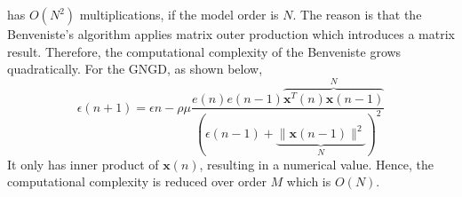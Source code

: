 has $O(N^2)$ multiplications, if the model order is $N$. The reason is that the Benveniste's algorithm applies matrix outer production which introduces a matrix result. Therefore, the computational complexity of the Benveniste grows quadratically. For the GNGD, as shown below,
\begin{equation}
	\epsilon(n+1)=\epsilon{n}-\rho\mu\frac{e(n)e(n-1)\overbrace{\mathbf x^T(n)\mathbf x(n-1)}^{N}}{(\epsilon(n-1)+\underbrace{\|\mathbf x(n-1)\|^2}_{N})^2}
\end{equation}
It only has inner product of $\mathbf x(n)$, resulting in a numerical value. Hence, the computational complexity is reduced over order $M$ which is $O(N)$.







